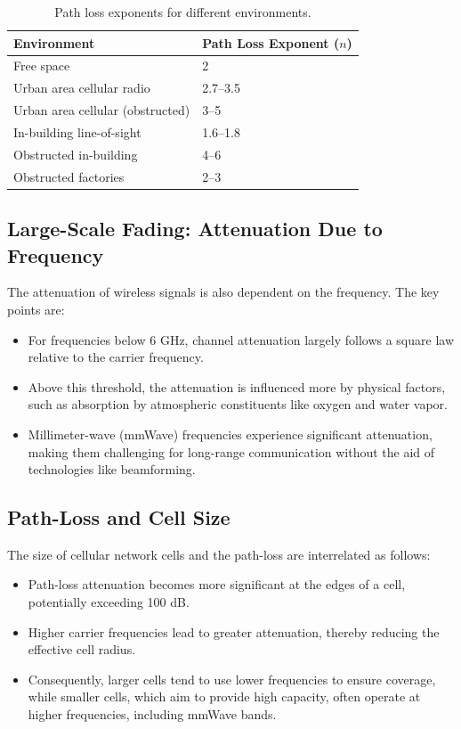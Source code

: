 \begin{table}[h!]
\centering
\begin{tabular}{ll}
\hline
\textbf{Environment} & \textbf{Path Loss Exponent (\(n\))} \\
\hline
Free space & 2 \\
Urban area cellular radio & 2.7--3.5 \\
Urban area cellular (obstructed) & 3--5 \\
In-building line-of-sight & 1.6--1.8 \\
Obstructed in-building & 4--6 \\
Obstructed factories & 2--3 \\
\hline
\end{tabular}
\caption{Path loss exponents for different environments.}
\label{table:pathlossexponents}
\end{table}







\subsection*{Large-Scale Fading: Attenuation Due to Frequency}

The attenuation of wireless signals is also dependent on the frequency. The key points are:

\begin{itemize}
    \item For frequencies below 6 GHz, channel attenuation largely follows a square law relative to the carrier frequency.
    \item Above this threshold, the attenuation is influenced more by physical factors, such as absorption by atmospheric constituents like oxygen and water vapor.
    \item Millimeter-wave (mmWave) frequencies experience significant attenuation, making them challenging for long-range communication without the aid of technologies like beamforming.
\end{itemize}
\subsection*{Path-Loss and Cell Size}

The size of cellular network cells and the path-loss are interrelated as follows:

\begin{itemize}
    \item Path-loss attenuation becomes more significant at the edges of a cell, potentially exceeding 100 dB.
    \item Higher carrier frequencies lead to greater attenuation, thereby reducing the effective cell radius.
    \item Consequently, larger cells tend to use lower frequencies to ensure coverage, while smaller cells, which aim to provide high capacity, often operate at higher frequencies, including mmWave bands.
\end{itemize}

